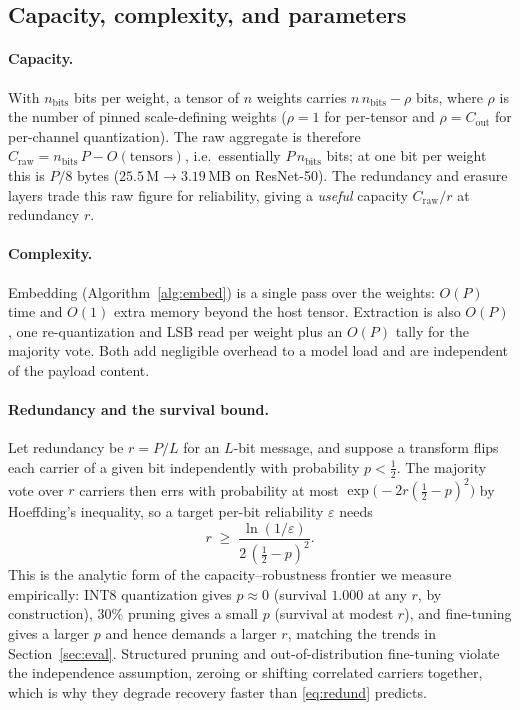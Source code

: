 \documentclass[10pt,journal]{IEEEtran}
\theoremstyle{remark}
\begin{document}
\subsection{Capacity, complexity, and parameters}\label{sec:analysis}
\paragraph{Capacity.} With $n_{\mathrm{bits}}$ bits per weight, a tensor of $n$ weights
carries $n\,n_{\mathrm{bits}}-\rho$ bits, where $\rho$ is the number of pinned
scale-defining weights ($\rho=1$ for per-tensor and $\rho=C_{\mathrm{out}}$ for
per-channel quantization). The raw aggregate is therefore
$C_{\mathrm{raw}}=n_{\mathrm{bits}}\,P-O(\text{tensors})$, i.e.\ essentially
$P\,n_{\mathrm{bits}}$ bits; at one bit per weight this is $P/8$ bytes
($25.5\,\mathrm{M}\to 3.19$\,MB on ResNet-50). The redundancy and erasure layers trade
this raw figure for reliability, giving a \emph{useful} capacity $C_{\mathrm{raw}}/r$ at
redundancy $r$.

\paragraph{Complexity.} Embedding (Algorithm~\ref{alg:embed}) is a single pass over the
weights: $O(P)$ time and $O(1)$ extra memory beyond the host tensor. Extraction is also
$O(P)$, one re-quantization and LSB read per weight plus an $O(P)$ tally for the majority
vote. Both add negligible overhead to a model load and are independent of the payload
content.

\paragraph{Redundancy and the survival bound.} Let redundancy be $r=P/L$ for an
$L$-bit message, and suppose a transform flips each carrier of a given bit independently
with probability $p<\tfrac12$. The majority vote over $r$ carriers then errs with
probability at most $\exp\!\big(-2r(\tfrac12-p)^2\big)$ by Hoeffding's inequality, so a
target per-bit reliability $\varepsilon$ needs
\begin{equation}\label{eq:redund}
r \;\ge\; \frac{\ln(1/\varepsilon)}{2\,(\tfrac12-p)^2}.
\end{equation}
This is the analytic form of the capacity--robustness frontier we measure empirically:
INT8 quantization gives $p\approx0$ (survival $1.000$ at any $r$, by construction),
$30\%$ pruning gives a small $p$ (survival at modest $r$), and fine-tuning gives a larger
$p$ and hence demands a larger $r$, matching the trends in
Section~\ref{sec:eval}. Structured pruning and out-of-distribution fine-tuning violate
the independence assumption, zeroing or shifting correlated carriers together, which is
why they degrade recovery faster than \eqref{eq:redund} predicts.
\end{document}
